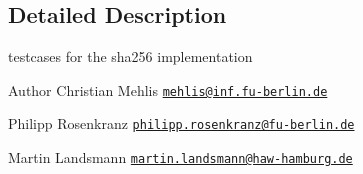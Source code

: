 \subsection{Detailed Description}
testcases for the sha256 implementation 

\begin{DoxyAuthor}{Author}
Christian Mehlis \href{mailto:mehlis@inf.fu-berlin.de}{\tt mehlis@inf.\+fu-\/berlin.\+de} 

Philipp Rosenkranz \href{mailto:philipp.rosenkranz@fu-berlin.de}{\tt philipp.\+rosenkranz@fu-\/berlin.\+de} 

Martin Landsmann \href{mailto:martin.landsmann@haw-hamburg.de}{\tt martin.\+landsmann@haw-\/hamburg.\+de} 
\end{DoxyAuthor}
